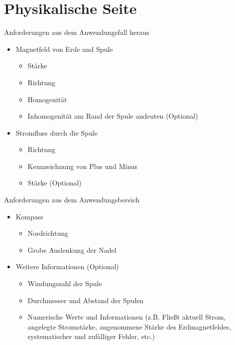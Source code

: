 \part{Physikalische Seite}
\begin{frame}[fragile]{Anforderungen aus dem Anwendungsfall heraus}
\begin{itemize}
	\item Magnetfeld von Erde und Spule
	\begin{itemize}
		\item Stärke
		\item Richtung
		\item Homogenität
		\item Inhomogenität am Rand der Spule andeuten (Optional) 
	\end{itemize}
	\item Stromfluss durch die Spule
	\begin{itemize}
		\item Richtung
		\item Kennzeichnung von Plus und Minus
		\item Stärke (Optional) 
	\end{itemize}
\end{itemize}
\end{frame}

\begin{frame}[fragile]{Anforderungen aus dem Anwendungsbereich}
\begin{itemize}
	\setlength{\itemsep}{-0.25em}
	\item Kompass
	\begin{itemize}
		\setlength{\itemsep}{-0.25em}
		\item Nordrichtung
		\item Grobe Auslenkung der Nadel
	\end{itemize}
	\item Weitere Informationen (Optional)
	\begin{itemize}
		\item Windungszahl der Spule
		\item Durchmesser und Abstand der Spulen
		\item Numerische Werte und Informationen (z.B. Fließt aktuell Strom, angelegte Stromstärke, angenommene Stärke des Erdmagnetfeldes, systematischer und zufälliger Fehler, etc.)
	\end{itemize}
\end{itemize}
\end{frame}

